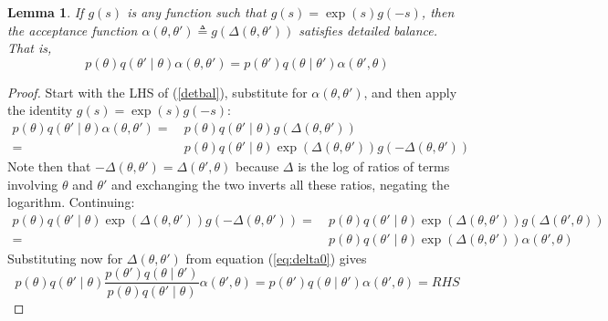 \documentclass{article}
\newtheorem{lemma}{Lemma}
\begin{document}
\begin{lemma}\label{lem:detailed_balance}
  If $g(s)$ is any function such that $g(s) = \exp(s) g(-s)$, then the acceptance function $\alpha(\theta,\theta') \triangleq  g(\Delta(\theta,\theta'))$ satisfies detailed balance. That is,
  \begin{equation}\label{detbal}
    p(\theta)q(\theta'\mid\theta)\alpha(\theta,\theta') = p(\theta')q(\theta\mid\theta')\alpha(\theta',\theta)
    \end{equation}

\end{lemma}

\begin{proof}
  Start with the LHS of (\ref{detbal}), substitute for $\alpha(\theta,\theta')$, and then apply the
  identity $g(s) = \exp(s)g(-s)$:
  \begin{equation}\label{detbal1}
    \begin{split}
      p(\theta)q(\theta'\mid\theta)\alpha(\theta,\theta') =~ & p(\theta)q(\theta'\mid\theta)g(\Delta(\theta,\theta'))\\
      =~ & p(\theta)q(\theta'\mid\theta)\exp(\Delta(\theta,\theta'))g(-\Delta(\theta,\theta'))
    \end{split}
  \end{equation}
  Note then that $-\Delta(\theta,\theta') = \Delta(\theta',\theta)$ because $\Delta$ is the log of ratios of
  terms involving $\theta$ and $\theta'$ and exchanging the two inverts all these ratios, negating the
  logarithm. Continuing:
  \begin{equation}\label{detbal2}
    \begin{split}
    p(\theta)q(\theta'\mid\theta)\exp(\Delta(\theta,\theta'))g(-\Delta(\theta,\theta')) = ~ & p(\theta)q(\theta'\mid\theta)\exp(\Delta(\theta,\theta'))g(\Delta(\theta',\theta))\\
    = ~ & p(\theta)q(\theta'\mid\theta)\exp(\Delta(\theta,\theta'))\alpha(\theta',\theta)
    \end{split}
  \end{equation}
  Substituting now for $\Delta(\theta,\theta')$ from equation (\ref{eq:delta0}) gives
  \begin{equation*}\label{detbal3}
    p(\theta)q(\theta'\mid\theta)\frac{p(\theta')q(\theta\mid\theta')}{p(\theta)q(\theta'\mid\theta)}\alpha(\theta',\theta)
      = p(\theta')q(\theta\mid\theta')\alpha(\theta',\theta) = RHS
  \end{equation*}
\end{proof}
\end{document}
